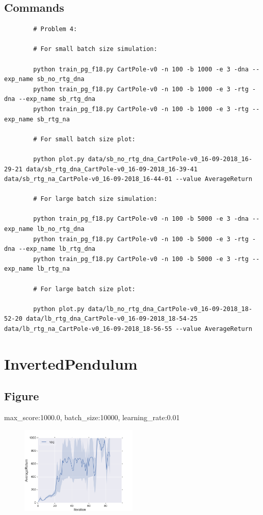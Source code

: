 \documentclass[12pt]{article}
\begin{document}
	\subsection{Commands}
	\begin{minipage}{\linewidth}
		\begin{lstlisting}
		# Problem 4:
		
		# For small batch size simulation:
		
		python train_pg_f18.py CartPole-v0 -n 100 -b 1000 -e 3 -dna --exp_name sb_no_rtg_dna
		python train_pg_f18.py CartPole-v0 -n 100 -b 1000 -e 3 -rtg -dna --exp_name sb_rtg_dna
		python train_pg_f18.py CartPole-v0 -n 100 -b 1000 -e 3 -rtg --exp_name sb_rtg_na
		
		# For small batch size plot:
		
		python plot.py data/sb_no_rtg_dna_CartPole-v0_16-09-2018_16-29-21 data/sb_rtg_dna_CartPole-v0_16-09-2018_16-39-41 data/sb_rtg_na_CartPole-v0_16-09-2018_16-44-01 --value AverageReturn
		
		# For large batch size simulation:
		
		python train_pg_f18.py CartPole-v0 -n 100 -b 5000 -e 3 -dna --exp_name lb_no_rtg_dna
		python train_pg_f18.py CartPole-v0 -n 100 -b 5000 -e 3 -rtg -dna --exp_name lb_rtg_dna
		python train_pg_f18.py CartPole-v0 -n 100 -b 5000 -e 3 -rtg --exp_name lb_rtg_na
		
		# For large batch size plot:
		
		python plot.py data/lb_no_rtg_dna_CartPole-v0_16-09-2018_18-52-20 data/lb_rtg_dna_CartPole-v0_16-09-2018_18-54-25 data/lb_rtg_na_CartPole-v0_16-09-2018_18-56-55 --value AverageReturn
		\end{lstlisting}
	\end{minipage}
	
	\pagebreak
	
	\section{InvertedPendulum}
	\subsection{Figure}
	max\_score:1000.0, batch\_size:10000, learning\_rate:0.01
	\begin{figure}[!htbp]
		\includegraphics[width=0.5\textwidth]{problem5.png}
	\end{figure}
\end{document}
